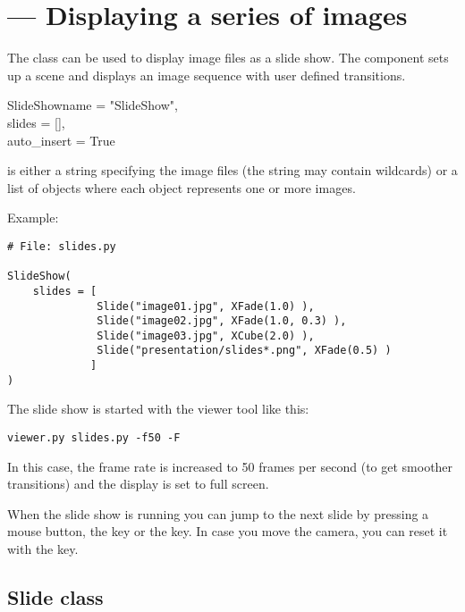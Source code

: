 
\section{ ---
         Displaying a series of images}

The  class can be used to display image files as
a slide show. The component sets up a scene and displays an image
sequence with user defined transitions.

\begin{classdesc}{SlideShow}{name = "SlideShow",\\ 
                             slides = [], \\
                             auto_insert = True}

 is either a string specifying the image files (the string
may contain wildcards) or a list of  objects where each
object represents one or more images.
\end{classdesc}

Example:

\begin{verbatim}
# File: slides.py

SlideShow(
    slides = [
              Slide("image01.jpg", XFade(1.0) ),
              Slide("image02.jpg", XFade(1.0, 0.3) ),
              Slide("image03.jpg", XCube(2.0) ),
              Slide("presentation/slides*.png", XFade(0.5) )
             ]
)
\end{verbatim}

The slide show is started with the viewer tool like this:

\begin{verbatim}
viewer.py slides.py -f50 -F
\end{verbatim}

In this case, the frame rate is increased to 50 frames per second (to get
smoother transitions) and the display is set to full screen.

When the slide show is running you can jump to the next slide by pressing
a mouse button, the  key or the  key.
In case you move the camera, you can reset it with the  key.

\subsection{Slide class}

